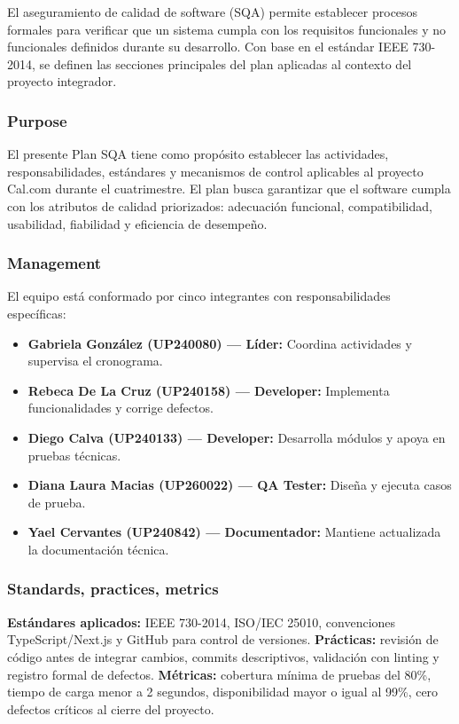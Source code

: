 \documentclass{article}
\begin{document}
El aseguramiento de calidad de software (SQA) permite establecer procesos formales para verificar que un sistema cumpla con los requisitos funcionales y no funcionales definidos durante su desarrollo. Con base en el estándar IEEE 730-2014, se definen las secciones principales del plan aplicadas al contexto del proyecto integrador.

\subsubsection{Purpose}
El presente Plan SQA tiene como propósito establecer las actividades, responsabilidades, estándares y mecanismos de control aplicables al proyecto Cal.com durante el cuatrimestre. El plan busca garantizar que el software cumpla con los atributos de calidad priorizados: adecuación funcional, compatibilidad, usabilidad, fiabilidad y eficiencia de desempeño.

\subsubsection{Management}
El equipo está conformado por cinco integrantes con responsabilidades específicas:
\begin{itemize}
    \item \textbf{Gabriela González (UP240080) — Líder:} Coordina actividades y supervisa el cronograma.
    \item \textbf{Rebeca De La Cruz (UP240158) — Developer:} Implementa funcionalidades y corrige defectos.
    \item \textbf{Diego Calva (UP240133) — Developer:} Desarrolla módulos y apoya en pruebas técnicas.
    \item \textbf{Diana Laura Macias (UP260022) — QA Tester:} Diseña y ejecuta casos de prueba.
    \item \textbf{Yael Cervantes (UP240842) — Documentador:} Mantiene actualizada la documentación técnica.
\end{itemize}

\subsubsection{Standards, practices, metrics}
\textbf{Estándares aplicados:} IEEE 730-2014, ISO/IEC 25010, convenciones TypeScript/Next.js y GitHub para control de versiones. \textbf{Prácticas:} revisión de código antes de integrar cambios, commits descriptivos, validación con linting y registro formal de defectos. \textbf{Métricas:} cobertura mínima de pruebas del 80\%, tiempo de carga menor a 2 segundos, disponibilidad mayor o igual al 99\%, cero defectos críticos al cierre del proyecto.
\end{document}
